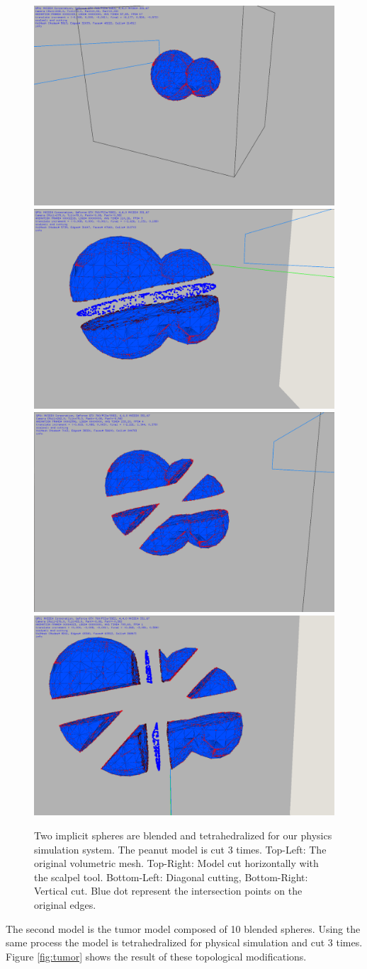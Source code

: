 \begin{figure}[H]
  \centering
  \includegraphics[width=0.4\linewidth]{figures/cutting/dumbel01.png}
  \includegraphics[width=0.4\linewidth]{figures/cutting/dumbel02.png}
  \includegraphics[width=0.4\linewidth]{figures/cutting/dumbel03.png}
  \includegraphics[width=0.4\linewidth]{figures/cutting/dumbel04.png}
  
  \caption{\label{fig:dumbelsexample}
  {Two implicit spheres are blended and tetrahedralized for our physics simulation system. The peanut model is cut 3 times.
  Top-Left: The original volumetric mesh. Top-Right: Model cut horizontally with the scalpel tool.
  Bottom-Left: Diagonal cutting, Bottom-Right: Vertical cut. Blue dot represent the intersection points on the original edges.}
}
\end{figure}

The second model is the tumor model composed of 10 blended spheres. Using the same process the model is tetrahedralized for physical simulation
and cut 3 times. Figure \ref{fig:tumor} shows the result of these topological modifications.


